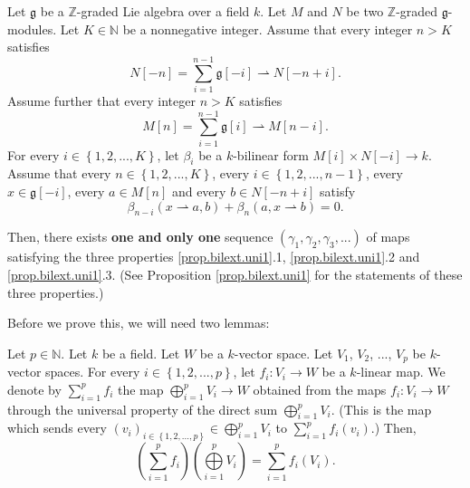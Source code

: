 \documentclass[etingof-lie.tex]{subfiles}
\begin{document}
\begin{noncompile}
\begin{proposition}
\label{prop.bilext.1}Let $\mathfrak{g}$ be a $\mathbb{Z}$-graded Lie algebra
over a field $k$. Let $M$ and $N$ be two $\mathbb{Z}$-graded $\mathfrak{g}%
$-modules. Let $K\in\mathbb{N}$ be a nonnegative integer. Assume that every
integer $n>K$ satisfies%
\begin{equation}
N\left[  -n\right]  =\sum\limits_{i=1}^{n-1}\mathfrak{g}\left[  -i\right]
\rightharpoonup N\left[  -n+i\right]  . \label{prop.bilext.1.gen1}%
\end{equation}
Assume further that every integer $n>K$ satisfies%
\begin{equation}
M\left[  n\right]  =\sum\limits_{i=1}^{n-1}\mathfrak{g}\left[  i\right]
\rightharpoonup M\left[  n-i\right]  . \label{prop.bilext.1.gen2}%
\end{equation}
For every $i\in\left\{  1,2,...,K\right\}  $, let $\beta_{i}$ be a
$k$-bilinear form $M\left[  i\right]  \times N\left[  -i\right]  \rightarrow
k$. Assume that every $n\in\left\{  1,2,...,K\right\}  $, every $i\in\left\{
1,2,...,n-1\right\}  $, every $x\in\mathfrak{g}\left[  -i\right]  $, every
$a\in M\left[  n\right]  $ and every $b\in N\left[  -n+i\right]  $ satisfy%
\begin{equation}
\beta_{n-i}\left(  x\rightharpoonup a,b\right)  +\beta_{n}\left(
a,x\rightharpoonup b\right)  =0. \label{prop.bilext.1.main}%
\end{equation}


Then, there exists \textbf{one and only one} sequence $\left(  \gamma
_{1},\gamma_{2},\gamma_{3},...\right)  $ of maps satisfying the three
properties \ref{prop.bilext.uni1}.1, \ref{prop.bilext.uni1}.2 and
\ref{prop.bilext.uni1}.3. (See Proposition \ref{prop.bilext.uni1} for the
statements of these three properties.)
\end{proposition}

Before we prove this, we will need two lemmas:

\begin{lemma}
\label{lem.bilext.1.1}Let $p\in\mathbb{N}$. Let $k$ be a field. Let $W$ be a
$k$-vector space. Let $V_{1}$, $V_{2}$, $...$, $V_{p}$ be $k$-vector spaces.
For every $i\in\left\{  1,2,...,p\right\}  $, let $f_{i}:V_{i}\rightarrow W$
be a $k$-linear map. We denote by $\sum\limits_{i=1}^{p}f_{i}$ the map
$\bigoplus\limits_{i=1}^{p}V_{i}\rightarrow W$ obtained from the maps
$f_{i}:V_{i}\rightarrow W$ through the universal property of the direct sum
$\bigoplus\limits_{i=1}^{p}V_{i}$. (This is the map which sends every $\left(
v_{i}\right)  _{i\in\left\{  1,2,...,p\right\}  }\in\bigoplus\limits_{i=1}%
^{p}V_{i}$ to $\sum\limits_{i=1}^{p}f_{i}\left(  v_{i}\right)  $.) Then,%
\[
\left(  \sum\limits_{i=1}^{p}f_{i}\right)  \left(  \bigoplus\limits_{i=1}%
^{p}V_{i}\right)  =\sum\limits_{i=1}^{p}f_{i}\left(  V_{i}\right)  .
\]


\end{lemma}
\end{noncompile}
\end{document}
